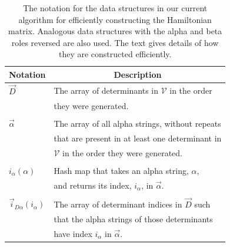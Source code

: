 \documentclass[%
reprint,
 superscriptaddress,
 amsmath,amssymb,
 aps,
]{revtex4-1}
\def\V{\mathcal{V}}
\def\vecD{\vec{D}}
\def\veca{\vec{\alpha}}
\def\ia{i_\alpha}
\def\veciDa{\vec{i}_{D\alpha}}
\begin{document}
\begin{table}[h]
\caption{The notation for the data structures in our current algorithm for efficiently constructing the Hamiltonian matrix.
Analogous data structures with the alpha and beta roles reversed are also used.
The text gives details of how they are constructed efficiently.}
\begin{tabular}{ll}
\hline
\hline
Notation& \multicolumn{1}{c}{Description}\\
\hline
$\vecD$ & The array of determinants in $\V$ in the order\\
& they were generated. \\
&\\
$\veca$ & The array of all alpha strings, without repeats\\
& that are present in at least one determinant in\\
& $\V$ in the order they were generated. \\
&\\
$\ia(\alpha)$ & Hash map that takes an alpha string, $\alpha$, \\
& and returns its index, $\ia$, in $\veca$. \\
&\\
$\veciDa(\ia)$ & The array of determinant indices in $\vecD$ such\\
& that the alpha strings of those determinants \\
& have index $\ia$ in $\veca$. \\

\end{tabular}
\end{table}
\end{document}
